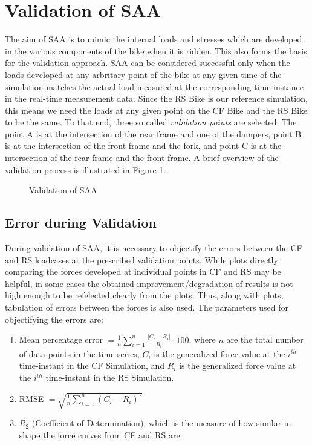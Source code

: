 \section{Validation of SAA}
\label{sec:kap2ab2}
The aim of SAA is to mimic the internal loads and stresses which are developed in the various components of the bike when it is ridden. This also forms the basis for the validation approach. SAA can be considered successful only when the loads developed at any arbritary point of the bike at any given time of the simulation matches the actual load measured at the corresponding time instance in the real-time measurement data. Since the RS Bike is our reference simulation, this means we need the loads at any given point on the CF Bike and the RS Bike to be the same. To that end, three so called \emph{validation points} are selected. The point A is at the intersection of the rear frame and one of the dampers, point B is at the intersection of the front frame and the fork, and point C is at the intersection of the rear frame and the front frame. A brief overview of the validation process is illustrated in Figure \ref{fig:validation}.
\begin{figure}[h!]
    
    \caption{Validation of SAA}
    \label{fig:validation}
\end{figure}

\subsection*{Error during Validation}
During validation of SAA, it is necessary to objectify the errors between the CF and RS loadcases at the prescribed validation points. While plots directly comparing the forces developed at individual points in CF and RS may be helpful, in some cases the obtained improvement/degradation of results is not high enough to be refelected clearly from the plots. Thus, along with plots, tabulation of errors between the forces is also used. The parameters used for objectifying the errors are:
\begin{enumerate}
	\item Mean percentage error $= \frac{1}{n} \sum_{i=1}^n \frac{\lvert C_i - R_i \rvert}{\lvert R_i \rvert} \cdot 100$, where $n$ are the total number of data-points in the time series, $C_i$ is the generalized force value at the $i^{th}$ time-instant in the CF Simulation, and $R_i$ is the generalized force value at the $i^{th}$ time-instant in the RS Simulation.
	\item RMSE $= \sqrt{\frac{1}{n} \sum_{i=1}^n (C_i - R_i)^2}$
	\item $R_2$ (Coefficient of Determination), which is the measure of how similar in shape the force curves from CF and RS are.

\end{enumerate}

